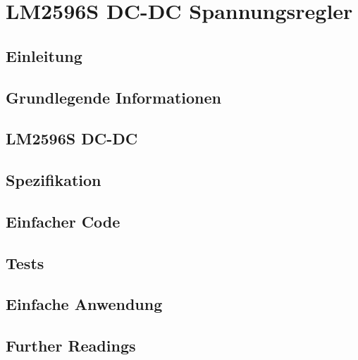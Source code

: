 %
%


\chapter{LM2596S DC-DC Spannungsregler}
\section{Einleitung}
\section{Grundlegende Informationen}
\section{LM2596S DC-DC}
\section{Spezifikation}
\section{Einfacher Code}
\section{Tests}
\section{Einfache Anwendung}
\section{Further Readings}